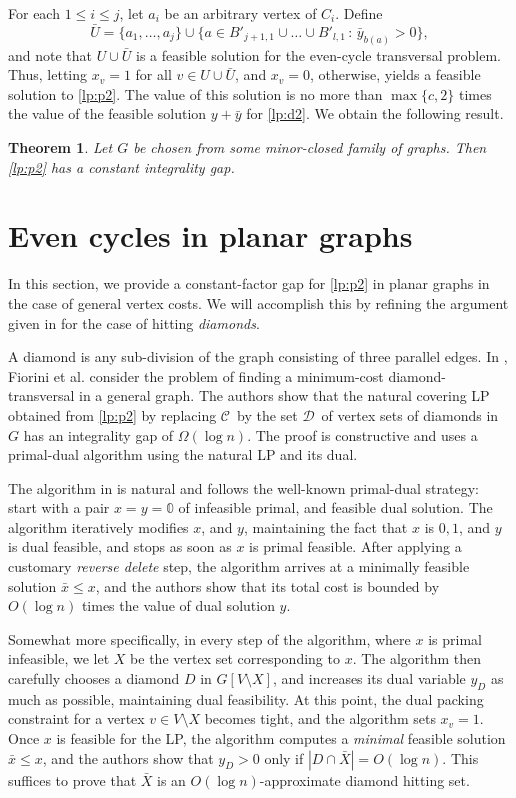 \documentclass{article}
\newcommand{\C}{\ensuremath{\mathcal{C}}}
\newcommand{\D}{\ensuremath{\mathcal{D}}}
\newcommand{\0}{\mathbb{0}}
\newcommand{\1}{\mathbb{1}}
\newtheorem{theorem}{Theorem}[section]
\begin{document}
For each $1 \leq i \leq j$, let $a_i$ be an arbitrary vertex of
$C_i$. Define
\[ \bar{U} = \{a_1, \ldots, a_j\} \cup \{ a \in B'_{j+1,1} \cup \ldots
  \cup B'_{l,1} \,:\, \bar{y}_{b(a)}>0\}, \]
and note that $U \cup \bar{U}$ is a feasible solution for the
even-cycle transversal problem. Thus, letting $x_v=1$ for all $v \in U
\cup \bar{U}$, and $x_v=0$, otherwise, yields a feasible solution to
\eqref{lp:p2}. The value of this solution is no more than
$\max\{c,2\}$ times the
value of the feasible solution $y+\bar{y}$ for \eqref{lp:d2}. 
We obtain the following result.

\begin{theorem}
  Let $G$ be chosen from some minor-closed family of graphs. Then
  \eqref{lp:p2} has a constant integrality gap. 
\end{theorem}

\section{Even cycles in planar graphs}

In this section, we provide a constant-factor gap for \eqref{lp:p2} in
planar graphs in the case of general vertex costs. We will accomplish
this by refining the argument given in \cite{FJP10} for the case of
hitting {\em diamonds}.

A diamond is any sub-division of the graph consisting of three
parallel edges. In \cite{FJP10}, Fiorini et al. consider the problem
of finding a minimum-cost diamond-transversal in a general graph. The
authors show that the natural covering LP obtained from \eqref{lp:p2}
by replacing \C\ by the set \D\ of vertex sets of diamonds in $G$ has
an integrality gap of $\Omega(\log n)$. The proof is constructive and uses
a primal-dual algorithm using the natural LP and its dual.

The algorithm in \cite{FJP10} is natural and follows the well-known
primal-dual strategy: start with a pair $x=y=\0$ of infeasible primal,
and feasible dual solution. The algorithm iteratively modifies $x$,
and $y$, maintaining the fact that $x$ is $0,1$, and $y$ is dual
feasible, and stops as soon as $x$ is primal feasible. After applying
a customary {\em reverse delete} step, the algorithm arrives at a
minimally feasible solution $\bar{x} \leq x$, and the authors show
that its total cost is bounded by $O(\log n)$ times the value of dual
solution $y$. 

Somewhat more specifically, in every step of the algorithm, where $x$
is primal infeasible, we let $X$ be the vertex set corresponding to
$x$. The algorithm then carefully chooses a diamond $D$ in
$G[V\setminus X]$, and increases its dual variable $y_D$ as much as
possible, maintaining dual feasibility. At this point, the dual packing
constraint for a vertex $v \in V\setminus X$ becomes tight, and the
algorithm sets $x_v=1$. Once $x$ is feasible for the LP, the algorithm
computes a {\em minimal} feasible solution $\bar{x} \leq x$, and the
authors show that $y_D > 0$ only if $|D \cap \bar{X}| =  O(\log
n)$. This suffices to prove that $\bar{X}$ is an $O(\log
n)$-approximate diamond hitting set. 
\end{document}
